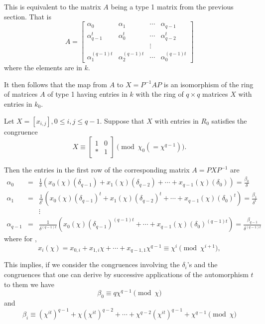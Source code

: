 \documentclass[11pt]{report}
\begin{document}
This is equivalent to the matrix $A$ being a type 1 matrix from the 
previous section. That is
\[
A = 
\begin{bmatrix}
\alpha_0 &\alpha_1 &\cdots&\alpha_{q-1}\\
\alpha_{q-1}^t &\alpha_0^t &\cdots&\alpha_{q-2}^t\\
&&\vdots& \\
 \alpha_1^{(q-1)t} &\alpha_2^{(q-1)t} &\cdots&\alpha_0^{(q-1)t}
\end{bmatrix}
\]
where the elements are in $k$.


It then follows that the map from $A$ to $X = P^{-1} A P$ is an 
isomorphism of the ring of
matrices $A$ of type 1 having entries in $k$ with the ring of $q \times q$ 
matrices $X$ with entries in $k_0$.


Let $X =  [x_{i,j}], 0\le i,j\le q-1$. Suppose that $X$ with entries in $R_0$ 
satisfies the congruence
\begin{equation}
 X\equiv 
\begin{bmatrix}
1&0\\
*&1
\end{bmatrix}
\pmod{\chi_0(=\chi^{q-1})}.
\label{eqn:Xissubdiagonal}
\end{equation}



Then the entries in the first row of the corresponding matrix 
$A = P X P^{-1}$ are
\begin{align*}
\alpha_0 &=& \frac{1}{\delta}\left( x_0(\chi)(\delta_{q-1}) + x_1(\chi)(\delta_{q-2}) 
+\cdots + x_{q-1}(\chi)(\delta_0)\right) =\frac{\beta_0}{\delta} \\
\alpha_1 &=&  \frac{1}{\delta^t}\left( x_0(\chi)(\delta_{q-1})^t + 
x_1(\chi)(\delta_{q-2})^t 
+\cdots + x_{q-1}(\chi)(\delta_0)^t\right)=\frac{\beta_1}{\delta^t} \\
&&\vdots \\
\alpha_{q-1}&=& \frac{1}{\delta^{(q-1)t}}\left( x_0(\chi)(\delta_{q-1})^{(q-1)t} +
\cdots + x_{q-1}(\chi)(\delta_0)^{(q-1)t}\right)=\frac{\beta_{q-1}}{\delta^{(q-1)t}}
\end{align*} 
where for ,
\[
x_i(\chi) = x_{0,i} + x_{1,i}\chi +\cdots+ x_{q-1,1}\chi^{q-1}\equiv 
\chi^i\pmod{\chi^{i+1}},
\]

This implies, if we consider the congruences involving the $\delta_i$'s
and the congruences that one
can derive by successive applications of the automorphism $t$ to 
them we have\[\beta_0\equiv q\chi^{q-1}\pmod{\chi}\]
and
\[\beta_i\equiv (\chi^{it})^{q-1}+\chi(\chi^{it})^{q-2}+
\cdots+\chi^{q-2}(\chi^{it})^{q-1}+\chi^{q-1}\pmod{\chi}\]
\end{document}
